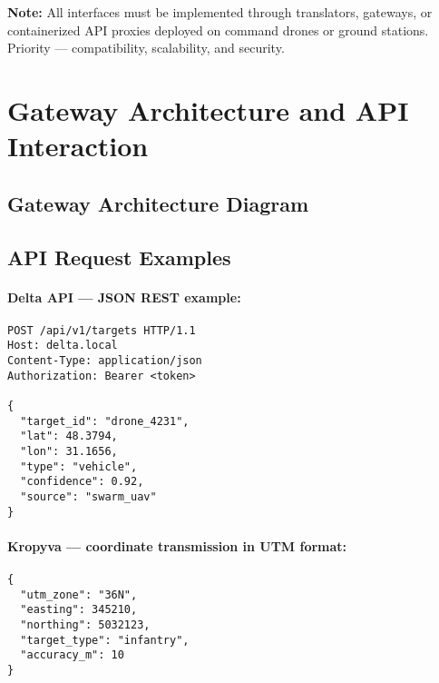 \documentclass[12pt]{article}
\begin{document}
\textbf{Note:} All interfaces must be implemented through translators, gateways, or containerized API proxies deployed on command drones or ground stations. Priority --- compatibility, scalability, and security.

\section{Gateway Architecture and API Interaction}
\subsection{Gateway Architecture Diagram}
\begin{center}
\end{center}

\subsection{API Request Examples}

\paragraph{Delta API --- JSON REST example:}
\begin{verbatim}
POST /api/v1/targets HTTP/1.1
Host: delta.local
Content-Type: application/json
Authorization: Bearer <token>

{
  "target_id": "drone_4231",
  "lat": 48.3794,
  "lon": 31.1656,
  "type": "vehicle",
  "confidence": 0.92,
  "source": "swarm_uav"
}
\end{verbatim}

\paragraph{Kropyva --- coordinate transmission in UTM format:}
\begin{verbatim}
{
  "utm_zone": "36N",
  "easting": 345210,
  "northing": 5032123,
  "target_type": "infantry",
  "accuracy_m": 10
}
\end{verbatim}
\end{document}
